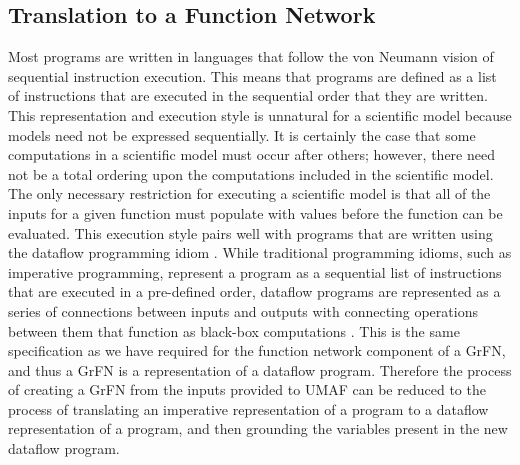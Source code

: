 \subsection{Translation to a Function Network \label{sec:translation_func_net}}
Most programs are written in languages that follow the von Neumann vision of sequential instruction execution.
This means that programs are defined as a list of instructions that are executed in the sequential order that they are written.
This representation and execution style is unnatural for a scientific model because models need not be expressed sequentially.
It is certainly the case that some computations in a scientific model must occur after others; however, there need not be a total ordering upon the computations included in the scientific model.
The only necessary restriction for executing a scientific model is that all of the inputs for a given function must populate with values before the function can be evaluated.
This execution style pairs well with programs that are written using the dataflow programming idiom \citep{johnston2004dataflowadvances}.
While traditional programming idioms, such as imperative programming, represent a program as a sequential list of instructions that are executed in a pre-defined order, dataflow programs are represented as a series of connections between inputs and outputs with connecting operations between them that function as black-box computations \citep{wadge1985lucid}.
This is the same specification as we have required for the function network component of a GrFN, and thus a GrFN is a representation of a dataflow program.
Therefore the process of creating a GrFN from the inputs provided to UMAF can be reduced to the process of translating an imperative representation of a program to a dataflow representation of a program, and then grounding the variables present in the new dataflow program.

